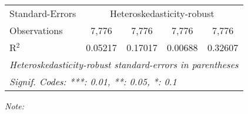\begin{table}[htbp!]
\begin{adjustbox}{width = 1\textwidth, max height = 0.95\textheight, center}
\begin{threeparttable}[b]
\begin{tabular}{lcccc}
            \midrule 
            Standard-Errors & \multicolumn{4}{c}{Heteroskedasticity-robust} \\ 
            Observations         & 7,776                          & 7,776                          & 7,776                          & 7,776\\  
            R$^2$                & 0.05217                        & 0.17017                        & 0.00688                        & 0.32607\\  
            \midrule \midrule
            \multicolumn{5}{l}{\emph{Heteroskedasticity-robust standard-errors in parentheses}}\\
            \multicolumn{5}{l}{\emph{Signif. Codes: ***: 0.01, **: 0.05, *: 0.1}}\\
         \end{tabular}
         
         \begin{tablenotes}\item \medskip \textit{Note:}
         \end{tablenotes}
      \end{threeparttable}
   \end{adjustbox}
\end{table}


